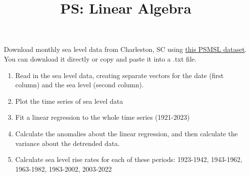 \documentclass{article}
\title{\vspace{-1in} PS: Linear Algebra}
\newcommand{\be}{\begin{enumerate}}
\newcommand{\ee}{\end{enumerate}}
\begin{document}
\maketitle

Download monthly sea level data from Charleston, SC using \href{https://psmsl.org/data/obtaining/rlr.monthly.data/234.rlrdata}{this PSMSL dataset}. You can download it directly or copy and paste it into a .txt file.

\be
\item Read in the sea level data, creating separate vectors for the date (first column) and the sea level (second column).

\item Plot the time series of sea level data

\item Fit a linear regression to the whole time series (1921-2023)

\item Calculate the anomalies about the linear regression, and then calculate the variance about the detrended data.

\item Calculate sea level rise rates for each of these periods: 1923-1942, 1943-1962, 1963-1982, 1983-2002, 2003-2022


\ee
\end{document}

